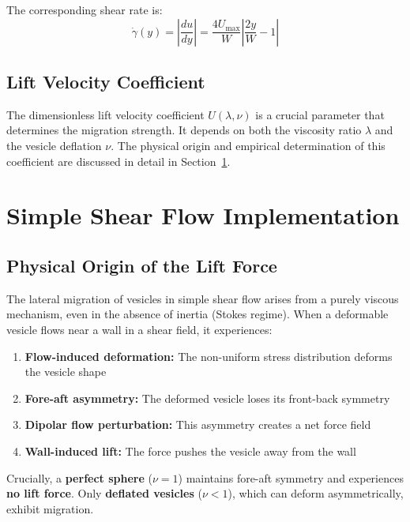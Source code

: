 \documentclass{article}
\begin{document}
The corresponding shear rate is:
\begin{equation}
    \dot{\gamma}(y) = \left| \frac{du}{dy} \right| = \frac{4 U_{\max}}{W} \left| \frac{2y}{W} - 1 \right|
    \label{eq:shear_rate}
\end{equation}

\subsection{Lift Velocity Coefficient}

The dimensionless lift velocity coefficient $U(\lambda, \nu)$ is a crucial parameter that determines the migration strength. It depends on both the viscosity ratio $\lambda$ and the vesicle deflation $\nu$. The physical origin and empirical determination of this coefficient are discussed in detail in Section~\ref{sec:lift_implementation}.

\section{Simple Shear Flow Implementation}
\label{sec:lift_implementation}

\subsection{Physical Origin of the Lift Force}

The lateral migration of vesicles in simple shear flow arises from a purely viscous mechanism, even in the absence of inertia (Stokes regime). When a deformable vesicle flows near a wall in a shear field, it experiences:

\begin{enumerate}
    \item \textbf{Flow-induced deformation:} The non-uniform stress distribution deforms the vesicle shape
    \item \textbf{Fore-aft asymmetry:} The deformed vesicle loses its front-back symmetry
    \item \textbf{Dipolar flow perturbation:} This asymmetry creates a net force field
    \item \textbf{Wall-induced lift:} The force pushes the vesicle away from the wall
\end{enumerate}

Crucially, a \textbf{perfect sphere} ($\nu = 1$) maintains fore-aft symmetry and experiences \textbf{no lift force}. Only \textbf{deflated vesicles} ($\nu < 1$), which can deform asymmetrically, exhibit migration.
\end{document}
